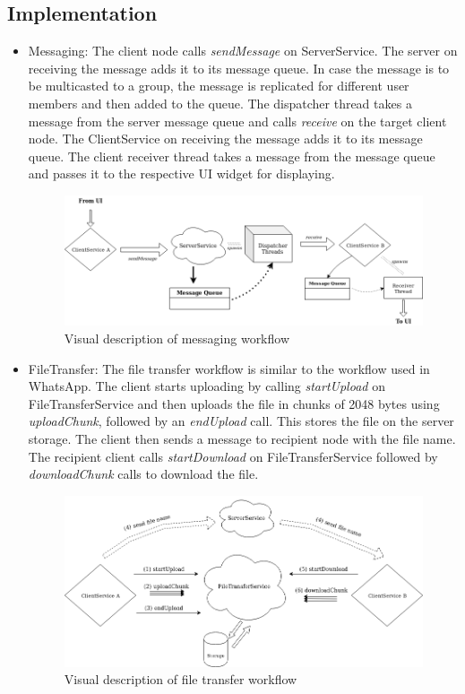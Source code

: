 \documentclass[a4paper,10pt]{article}
\begin{document}
\subsection{Implementation}
\begin{itemize}
    \item Messaging: The client node calls \textit{sendMessage} on ServerService. The server on receiving the message adds it to its message queue. In case the message is to be multicasted to a group, the message is replicated for different user members and then added to the queue. The dispatcher thread takes a message from the server message queue and calls \textit{receive} on the target client node. The ClientService on receiving the message adds it to its message queue. The client receiver thread takes a message from the message queue and passes it to the respective UI widget for displaying.
    \begin{figure}[h]
        \includegraphics[scale=0.4]{messageWorkflow}
        \caption{Visual description of messaging workflow}
        \label{fig:diagram1}
    \end{figure}
    
    \item FileTransfer: The file transfer workflow is similar to the workflow used in WhatsApp. The client starts uploading by calling \textit{startUpload} on FileTransferService and then uploads the file in chunks of 2048 bytes using \textit{uploadChunk}, followed by an \textit{endUpload} call. This stores the file on the server storage. The client then sends a message to recipient node with the file name. The recipient client calls \textit{startDownload} on FileTransferService followed by \textit{downloadChunk} calls to download the file.
    \begin{figure}[h]
        \hspace{1cm}
        \includegraphics[scale=0.35]{FileTransferWorkflow}
        \caption{Visual description of file transfer workflow}
        \label{fig:diagram2}
    \end{figure}
    
\end{itemize}
\end{document}
